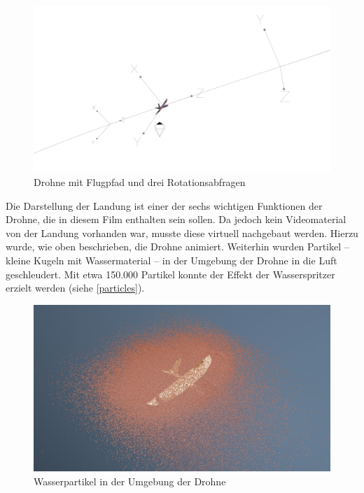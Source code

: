 \begin{figure}[H]
\begin{center}
\includegraphics[width=\textwidth]{gfx/prod/plane/an_flight.jpg}
\caption{Drohne mit Flugpfad und drei Rotationsabfragen}
\label{an_flight}
\end{center}
\end{figure}
\noindent
Die Darstellung der Landung ist einer der sechs wichtigen Funktionen der Drohne, die in diesem Film enthalten sein sollen.
Da jedoch kein Videomaterial von der Landung vorhanden war, musste diese virtuell nachgebaut werden. Hierzu wurde, wie oben beschrieben, die Drohne animiert. Weiterhin wurden Partikel -- kleine Kugeln mit Wassermaterial -- in der Umgebung der Drohne in die Luft geschleudert. Mit etwa 150.000 Partikel konnte der Effekt der Wasserspritzer erzielt werden (siehe \autoref{particles}).

\begin{figure}[H]
\begin{center}
\includegraphics[width=\textwidth]{gfx/prod/plane/particles.jpg}
\caption{Wasserpartikel in der Umgebung der Drohne}
\label{particles}
\end{center}
\end{figure}
%

